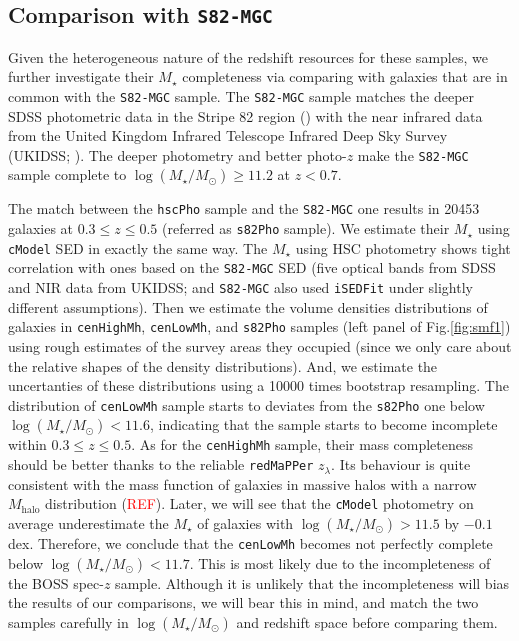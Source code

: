 \documentclass{emulateapj}
\def\redm{\texttt{redMaPPer}}
\def\cmodel{\texttt{cModel}}
\def\rbcg{\texttt{cenHighMh}}
\def\nbcg{\texttt{cenLowMh}}
\def\mstar{{$M_{\star}$}}
\def\mhalo{{$M_{\mathrm{halo}}$}}
\def\logms{{$\log (M_{\star}/M_{\odot})$}}
\newcommand{\addref}{{\textcolor{red}{REF}}}
\begin{document}
\begin{CJK*}{UTF8}{gbsn}
\subsection{Comparison with \texttt{S82-MGC}}
    \label{ssec:s82}

    Given the heterogeneous nature of the redshift resources for these samples, we 
    further investigate their \mstar{} completeness via comparing with galaxies that are 
    in common with the \texttt{S82-MGC} sample. 
    The \texttt{S82-MGC} sample matches the deeper SDSS photometric data in the Stripe 82 
    region (\citealt{Annis2014}) with the near infrared data from the United Kingdom 
    Infrared Telescope Infrared Deep Sky Survey (UKIDSS; \citealt{Lawrence2007}). 
    The deeper photometry and better photo-$z$ make the \texttt{S82-MGC} sample complete 
    to \logms{}$\geq 11.2$ at $z<0.7$.  
    
    The match between the \texttt{hscPho} sample and the \texttt{S82-MGC} one results in 
    20453 galaxies at $0.3 \leq z \leq 0.5$ (referred as \texttt{s82Pho} sample).  
    We estimate their \mstar{} using \texttt{cModel} SED in exactly the same way. 
    The \mstar{} using HSC photometry shows tight correlation with ones based on the
    \texttt{S82-MGC} SED (five optical bands from SDSS and NIR data from UKIDSS; and 
    \texttt{S82-MGC} also used \texttt{iSEDFit} under slightly different assumptions).  
    Then we estimate the volume densities distributions of galaxies in \rbcg{}, \nbcg{}, 
    and \texttt{s82Pho} samples (left panel of Fig.\ref{fig:smf1}) using rough estimates 
    of the survey areas they occupied (since we only care about the relative shapes of 
    the density distributions). 
    And, we estimate the uncertanties of these distributions using a 10000 times 
    bootstrap resampling. 
    The distribution of \nbcg{} sample starts to deviates from the \texttt{s82Pho} one 
    below \logms{}$< 11.6$, indicating that the sample starts to become incomplete within
    $0.3 \leq z \leq 0.5$. 
    As for the \rbcg{} sample, their mass completeness should be better thanks to the 
    reliable \redm{} $z_{\lambda}$. 
    Its behaviour is quite consistent with the mass function of galaxies in massive 
    halos with a narrow \mhalo{} distribution (\addref).   
    Later, we will see that the \cmodel{} photometry on average underestimate the 
    \mstar{} of galaxies with \logms{}$>11.5$ by $-0.1$ dex.
    Therefore, we conclude that the \nbcg{} becomes not perfectly complete below 
    \logms{}$< 11.7$.  
    This is most likely due to the incompleteness of the BOSS spec-$z$ sample. 
    Although it is unlikely that the incompleteness will bias the results of our 
    comparisons, we will bear this in mind, and match the two samples carefully in 
    \logms{} and redshift space before comparing them.


\end{CJK*}
\end{document}
